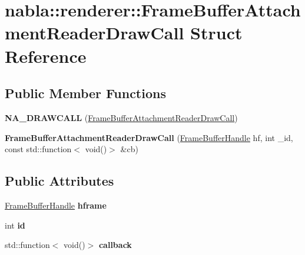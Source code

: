\hypertarget{structnabla_1_1renderer_1_1_frame_buffer_attachment_reader_draw_call}{}\section{nabla\+::renderer\+::Frame\+Buffer\+Attachment\+Reader\+Draw\+Call Struct Reference}
\label{structnabla_1_1renderer_1_1_frame_buffer_attachment_reader_draw_call}
\subsection*{Public Member Functions}
\begin{DoxyCompactItemize}
\item 
\mbox{\label{structnabla_1_1renderer_1_1_frame_buffer_attachment_reader_draw_call_a27fde3dea5b2839f60c20568002775d0}} 
{\bfseries N\+A\+\_\+\+D\+R\+A\+W\+C\+A\+LL} (\mbox{\hyperlink{structnabla_1_1renderer_1_1_frame_buffer_attachment_reader_draw_call}{Frame\+Buffer\+Attachment\+Reader\+Draw\+Call}})
\item 
\mbox{\label{structnabla_1_1renderer_1_1_frame_buffer_attachment_reader_draw_call_ab60563f0d6bde4ae72f3f84ef5d4bc66}} 
{\bfseries Frame\+Buffer\+Attachment\+Reader\+Draw\+Call} (\mbox{\hyperlink{classnabla_1_1renderer_1_1_handle}{Frame\+Buffer\+Handle}} hf, int \+\_\+id, const std\+::function$<$ void()$>$ \&cb)
\end{DoxyCompactItemize}
\subsection*{Public Attributes}
\begin{DoxyCompactItemize}
\item 
\mbox{\label{structnabla_1_1renderer_1_1_frame_buffer_attachment_reader_draw_call_a0f84d38097957606bb69e90296e3d756}} 
\mbox{\hyperlink{classnabla_1_1renderer_1_1_handle}{Frame\+Buffer\+Handle}} {\bfseries hframe}
\item 
\mbox{\label{structnabla_1_1renderer_1_1_frame_buffer_attachment_reader_draw_call_a345b224bdf5ac74033b41f2e76378744}} 
int {\bfseries id}
\item 
\mbox{\label{structnabla_1_1renderer_1_1_frame_buffer_attachment_reader_draw_call_a82acf532ab0d65858c3c66492dcc2951}} 
std\+::function$<$ void()$>$ {\bfseries callback}
\end{DoxyCompactItemize}


